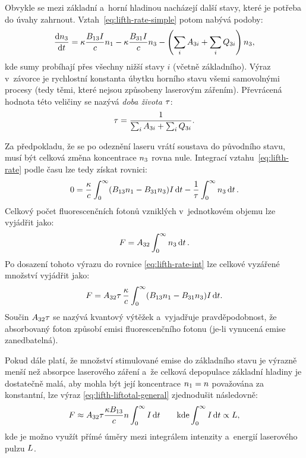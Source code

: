 Obvykle se mezi základní a~horní hladinou nacházejí další stavy,
které je potřeba do úvahy zahrnout.
Vztah~\eqref{eq:lifth-rate-simple} potom nabývá podoby:
\begin{equation}
	\label{eq:lifth-rate}
	\dv{n_3}{t}
	= \kappa \frac{B_{13} I}{c} n_1
	- \kappa \frac{B_{31} I}{c} n_3
	- \left( \sum_i A_{3i} + \sum_i Q_{3i} \right) n_3,
\end{equation}
kde sumy probíhají přes všechny nižší stavy $i$ (včetně základního).
Výraz v~závorce je rychlostní konstanta úbytku horního stavu všemi
samovolnými procesy (tedy těmi, které nejsou způsobeny laserovým zářením).
Převrácená hodnota této veličiny se nazývá \emph{doba života} $\tau$:
\begin{equation}
	\label{eq:lifth-lifetime-def}
	\tau = \frac{1}{\sum_i A_{3i} + \sum_i Q_{3i}}.
\end{equation}

Za předpokladu, že se po odeznění laseru vrátí soustava do původního stavu,
musí být celková změna koncentrace $n_3$ rovna nule.
Integrací vzta\-hu~\eqref{eq:lifth-rate} podle času lze tedy získat rovnici:
\begin{equation}
	\label{eq:lifth-rate-int}
	0 = \frac{\kappa}{c}
	\int_0^\infty (B_{13} n_1 - B_{31} n_3) I\,\dd t
	- \frac1{\tau} \int_0^\infty n_3 \dd{t}.
\end{equation}
Celkový počet fluorescenčních fotonů vzniklých v~jednotkovém objemu
lze vyjádřit jako:
\begin{equation}
	\label{eq:lifth-liftotal-def}
	F = A_{32} \int_0^\infty n_3 \dd{t}.
\end{equation}
Po dosazení tohoto výrazu do rovnice \eqref{eq:lifth-rate-int}
lze celkové vyzářené množství vyjádřit jako:
\begin{equation}
	\label{eq:lifth-liftotal-general}
	F = A_{32} \tau \, \frac{\kappa}{c}
	\int_0^\infty
	(B_{13} n_1 - B_{31} n_3)
	I\,\dd t.
\end{equation}
Součin $A_{32} \tau$ se nazývá kvantový výtěžek a~vyjadřuje
pravděpodobnost, že absorbovaný foton způsobí emisi fluorescenčního fotonu
(je-li vynucená emise zanedbatelná).

Pokud dále platí, že množství stimulované emise do základního stavu
je výrazně menší než absorpce laserového záření
a~že celková depopulace základní hladiny je dostatečně malá,
aby mohla být její koncentrace $n_1 = n$ považována za konstantní,
lze výraz \eqref{eq:lifth-liftotal-general} zjednodušit následovně:
\begin{equation}
	\label{eq:lifth-liftotal-linear}
	F \approx A_{32} \tau
	\frac{\kappa B_{13}}{c}
	n
	\int_0^\infty I\,\dd t
	\qquad
	\text{kde} \int_0^\infty I\,\dd t \propto L,
\end{equation}
kde je možno využít přímé úměry mezi integrálem intenzity
a~energií laserového pulzu $L$.

